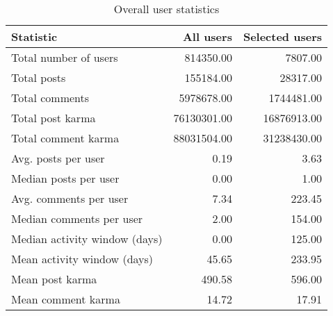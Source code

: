 \begin{table}[H]
\centering
\begin{tabular}{lrr}
\toprule
 Statistic                     &   All users &   Selected users \\
\midrule
 Total number of users         &   814350.00 &          7807.00 \\
 Total posts                   &   155184.00 &         28317.00 \\
 Total comments                &  5978678.00 &       1744481.00 \\
 Total post karma              & 76130301.00 &      16876913.00 \\
 Total comment karma           & 88031504.00 &      31238430.00 \\
 Avg. posts per user           &        0.19 &             3.63 \\
 Median posts per user         &        0.00 &             1.00 \\
 Avg. comments per user        &        7.34 &           223.45 \\
 Median comments per user      &        2.00 &           154.00 \\
 Median activity window (days) &        0.00 &           125.00 \\
 Mean activity window (days)   &       45.65 &           233.95 \\
 Mean post karma               &      490.58 &           596.00 \\
 Mean comment karma            &       14.72 &            17.91 \\
\bottomrule
\end{tabular}
\caption{ Overall user statistics }
\vspace{10pt}
\end{table}
